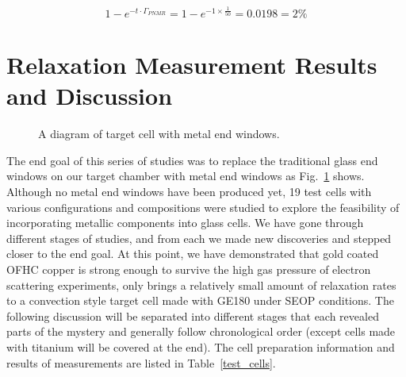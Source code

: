\begin{equation}
1-e^{-t\cdot \Gamma_{PNMR}} = 1-e^{-1\times \frac{1}{50}} =0.0198=2\%
\end{equation}

\section{Relaxation Measurement Results and Discussion}

\begin{figure}[t!]
	\centering
	\caption{{A diagram of target cell with metal end windows. }}
	\label{metal_end_windows}
\end{figure}

The end goal of this series of studies was to replace the traditional glass end windows on our target chamber with metal end windows as Fig.~\ref{metal_end_windows} shows. Although no metal end windows have been produced yet, 19 test cells with various configurations and compositions were studied to explore the feasibility of incorporating metallic components into glass cells. We have gone through different stages of studies, and from each we made new discoveries and stepped closer to the end goal. At this point, we have demonstrated that gold coated OFHC copper is strong enough to survive the high gas pressure of electron scattering experiments, only brings a relatively small amount of relaxation rates to a convection style target cell made with GE180 under SEOP conditions. The following discussion will be separated into different stages that each revealed parts of the mystery and generally follow chronological order (except cells made with titanium will be covered at the end). The cell preparation information and results of measurements are listed in Table~\ref{test_cells}.

